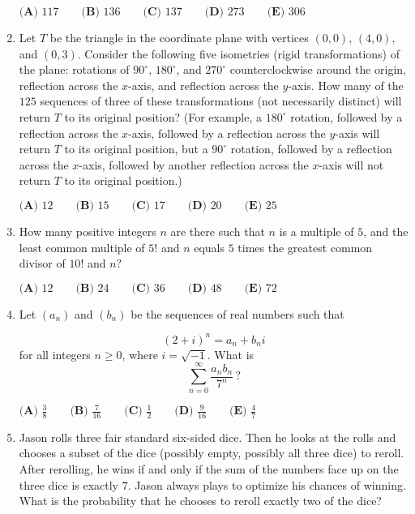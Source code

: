 \documentclass{article}
\begin{document}
\begin{enumerate}[label=\arabic*., itemsep=0.5em]
\(\textbf{(A) } 117 \qquad \textbf{(B) } 136 \qquad \textbf{(C) } 137 \qquad \textbf{(D) } 273 \qquad \textbf{(E) } 306\)\par \vspace{0.5em}\item Let \(T\) be the triangle in the coordinate plane with vertices \(\left(0,0\right)\), \(\left(4,0\right)\), and \(\left(0,3\right)\). Consider the following five isometries (rigid transformations) of the plane: rotations of \(90^{\circ}\), \(180^{\circ}\), and \(270^{\circ}\) counterclockwise around the origin, reflection across the \(x\)-axis, and reflection across the \(y\)-axis. How many of the \(125\) sequences of three of these transformations (not necessarily distinct) will return \(T\) to its original position? (For example, a \(180^{\circ}\) rotation, followed by a reflection across the \(x\)-axis, followed by a reflection across the \(y\)-axis will return \(T\) to its original position, but a \(90^{\circ}\) rotation, followed by a reflection across the \(x\)-axis, followed by another reflection across the \(x\)-axis will not return \(T\) to its original position.)

\(\textbf{(A) } 12\qquad\textbf{(B) } 15\qquad\textbf{(C) }17 \qquad\textbf{(D) }20 \qquad\textbf{(E) }25\)\par \vspace{0.5em}\item How many positive integers \(n\) are there such that \(n\) is a multiple of \(5\), and the least common multiple of \(5!\) and \(n\) equals \(5\) times the greatest common divisor of \(10!\) and \(n?\)

\(\textbf{(A) } 12 \qquad \textbf{(B) } 24 \qquad \textbf{(C) } 36 \qquad \textbf{(D) } 48 \qquad \textbf{(E) } 72\)\par \vspace{0.5em}\item Let \((a_n)\) and \((b_n)\) be the sequences of real numbers such that

\begin{equation*}
(2 + i)^n = a_n + b_ni
\end{equation*}
for all integers \(n\geq 0\), where \(i = \sqrt{-1}\). What is
\begin{equation*}
\sum_{n=0}^\infty\frac{a_nb_n}{7^n}\,?
\end{equation*}

\(\textbf{(A) }\frac 38\qquad\textbf{(B) }\frac7{16}\qquad\textbf{(C) }\frac12\qquad\textbf{(D) }\frac9{16}\qquad\textbf{(E) }\frac47\)\par \vspace{0.5em}\item Jason rolls three fair standard six-sided dice. Then he looks at the rolls and chooses a subset of the dice (possibly empty, possibly all three dice) to reroll. After rerolling, he wins if and only if the sum of the numbers face up on the three dice is exactly \(7\). Jason always plays to optimize his chances of winning. What is the probability that he chooses to reroll exactly two of the dice?


\end{enumerate}
\end{document}

